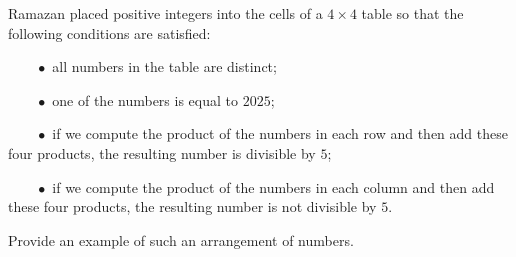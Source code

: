 Ramazan placed positive integers into the cells of a $4\times4$ table so that the following conditions are satisfied:

$\qquad\bullet$ all numbers in the table are distinct;

$\qquad\bullet$ one of the numbers is equal to $2025$;

$\qquad\bullet$ if we compute the product of the numbers in each row and then add these four products, the resulting number is divisible by $5$;

$\qquad\bullet$ if we compute the product of the numbers in each column and then add these four products, the resulting number is not divisible by $5$.

Provide an example of such an arrangement of numbers.
